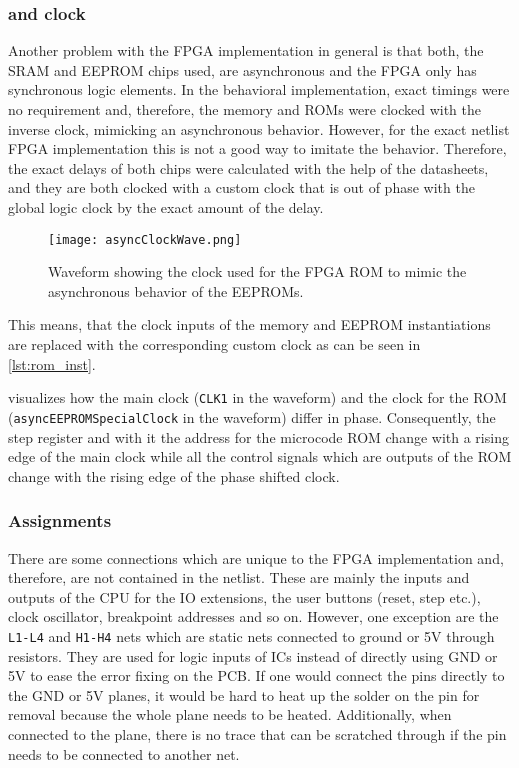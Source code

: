\subsubsection{ and  clock}
Another problem with the \gls{FPGA} implementation in general is that both, the \gls{SRAM} and \gls{EEPROM} chips used, are asynchronous and the \gls{FPGA} only has synchronous logic elements.
In the behavioral implementation, exact timings were no requirement and, therefore, the memory and \glspl{ROM} were clocked with the inverse clock, mimicking an asynchronous behavior.
However, for the exact netlist \gls{FPGA} implementation this is not a good way to imitate the behavior.
Therefore, the exact delays of both chips were calculated with the help of the datasheets, and they are both clocked with a custom clock that is out of phase with the global logic clock by the exact amount of the delay.
\begin{figure}
  \centering
  \texttt{[image: asyncClockWave.png]}
  \caption{Waveform showing the clock used for the \gls{FPGA} \gls{ROM} to mimic the asynchronous behavior of the \glspl{EEPROM}.}
  \label{fig:asyncClockWave}
\end{figure}

This means, that the clock inputs of the memory and \gls{EEPROM} instantiations are replaced with the corresponding custom clock as can be seen in \cref{lst:rom_inst}.

 visualizes how the main clock (\texttt{CLK1} in the waveform) and the clock for the \gls{ROM} (\texttt{asyncEEPROMSpecialClock} in the waveform) differ in phase.
Consequently, the step register and with it the address for the microcode \gls{ROM} change with a rising edge of the main clock while all the control signals which are outputs of the \gls{ROM} change with the rising edge of the phase shifted clock.

\subsubsection{Assignments}
There are some connections which are unique to the \gls{FPGA} implementation and, therefore, are not contained in the netlist.
These are mainly the inputs and outputs of the \gls{CPU} for the \gls{IO} extensions, the user buttons (reset, step etc.), clock oscillator, breakpoint addresses and so on.
However, one exception are the \texttt{L1-L4} and \texttt{H1-H4} nets which are static nets connected to ground or 5V through resistors.
They are used for logic inputs of \glspl{IC} instead of directly using GND or 5V to ease the error fixing on the \gls{PCB}.
If one would connect the pins directly to the GND or 5V planes, it would be hard to heat up the solder on the pin for removal because the whole plane needs to be heated.
Additionally, when connected to the plane, there is no trace that can be scratched through if the pin needs to be connected to another net.

